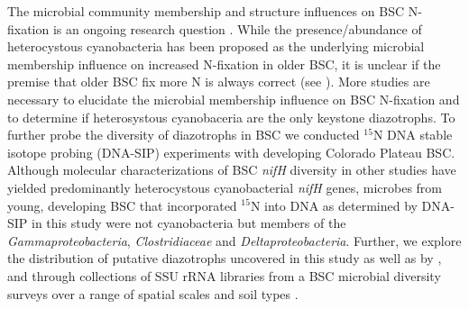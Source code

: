 The microbial community membership and structure influences on BSC N-fixation is an ongoing research question \cite{Belnap28062013}. While the presence/abundance of heterocystous cyanobacteria has been proposed as the underlying microbial membership influence on increased N-fixation in older BSC, it is unclear if the premise that older BSC fix more N is always correct (see \citet{15643930}). More studies are necessary to elucidate the microbial membership influence on BSC N-fixation and to determine if  heterosystous cyanobaceria are the only keystone diazotrophs. To further probe the diversity of diazotrophs in BSC we conducted $^{15}$N DNA stable isotope probing (DNA-SIP) experiments with developing Colorado Plateau BSC. Although molecular characterizations of BSC \textit{nifH} diversity in other studies have yielded predominantly heterocystous cyanobacterial \textit{nifH} genes, microbes from young, developing BSC that incorporated $^{15}$N into DNA as determined by DNA-SIP in this study were not cyanobacteria but members of the \textit{Gammaproteobacteria}, \textit{Clostridiaceae} and \textit{Deltaproteobacteria}. Further, we explore the distribution of putative diazotrophs uncovered in this study as well as by \citet{14766579}, \citet{Yeager} and \citet{Yeager_2012} through collections of SSU rRNA libraries from a BSC microbial diversity surveys over a range of spatial scales and soil types \cite{Garcia_Pichel_2013, Steven_2013}.  
